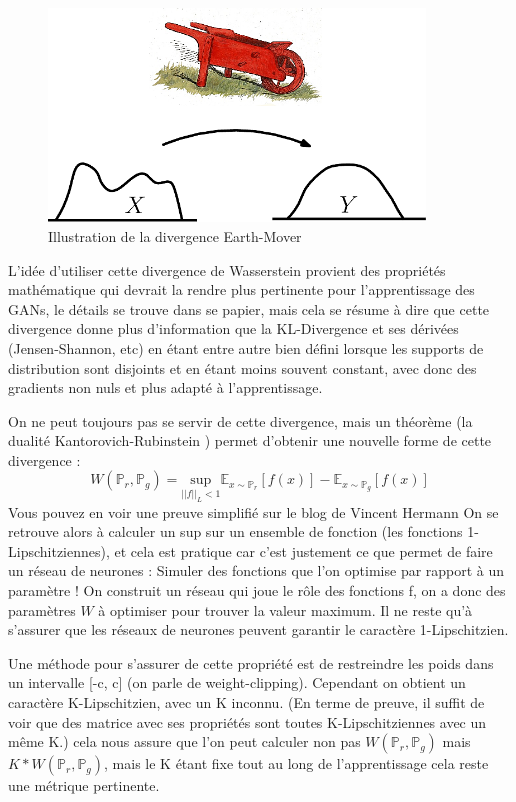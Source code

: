 \begin{figure}[ht!]
  \centering
    \includegraphics[width=10cm]{fig/Earth_mover_distance}
    \caption{Illustration de la divergence Earth-Mover}
    \label{fig:E-M_distance}
\end{figure}


L'idée d'utiliser cette divergence de Wasserstein provient des propriétés mathématique qui devrait la rendre plus pertinente pour l'apprentissage des GANs, le détails se trouve dans se papier, mais cela se résume à dire que cette divergence donne plus d'information que la KL-Divergence et ses dérivées (Jensen-Shannon, etc) en étant entre autre bien défini lorsque les supports de distribution sont disjoints et en étant moins souvent constant, avec donc des gradients non nuls et plus adapté à l'apprentissage.

On ne peut toujours pas se servir de cette divergence, mais un théorème (la dualité Kantorovich-Rubinstein \cite{optimal-transport}) permet d'obtenir une nouvelle forme de cette divergence :
\[
W(\mathbb{P}_r, \mathbb{P}_g) = \underset{||f||_L<1}{\text{sup}}\mathbb{E}_{x\sim\mathbb{P}_r}\left[f(x)\right] - \mathbb{E}_{x\sim\mathbb{P}_g}\left[f(x)\right]
\]
Vous pouvez en voir une preuve simplifié sur le blog de Vincent Hermann \cite{preuve-wgan}
On se retrouve alors à calculer un sup sur un ensemble de fonction (les fonctions 1-Lipschitziennes), et cela est pratique car c'est justement ce que permet de faire un réseau de neurones : Simuler des fonctions que l'on optimise par rapport à un paramètre ! On construit un réseau qui joue le rôle des fonctions f, on a donc des paramètres $W$ à optimiser pour trouver la valeur maximum. Il ne reste qu'à s'assurer que les réseaux de neurones peuvent garantir le caractère 1-Lipschitzien.

Une méthode pour s'assurer de cette propriété est de restreindre les poids dans un intervalle [-c, c] (on parle de weight-clipping). Cependant on obtient un caractère K-Lipschitzien, avec un K inconnu. (En terme de preuve, il suffit de voir que des matrice avec ses propriétés sont toutes K-Lipschitziennes avec un même K.) cela nous assure que l'on peut calculer non pas $W(\mathbb{P}_r, \mathbb{P}_g)$ mais $K*W(\mathbb{P}_r, \mathbb{P}_g)$, mais le K étant fixe tout au long de l'apprentissage cela reste une métrique pertinente. 

